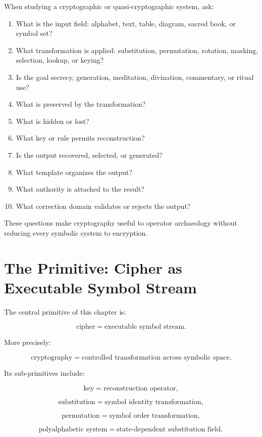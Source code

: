 \documentclass[11pt]{book}
\begin{document}
When studying a cryptographic or quasi-cryptographic system, ask:

\begin{enumerate}[label=\arabic*.]
    \item What is the input field: alphabet, text, table, diagram, sacred book, or symbol set?
    \item What transformation is applied: substitution, permutation, rotation, masking, selection, lookup, or keying?
    \item Is the goal secrecy, generation, meditation, divination, commentary, or ritual use?
    \item What is preserved by the transformation?
    \item What is hidden or lost?
    \item What key or rule permits reconstruction?
    \item Is the output recovered, selected, or generated?
    \item What template organizes the output?
    \item What authority is attached to the result?
    \item What correction domain validates or rejects the output?
\end{enumerate}

These questions make cryptography useful to operator archaeology without reducing every symbolic system to encryption.

\section{The Primitive: Cipher as Executable Symbol Stream}

The central primitive of this chapter is:

\[
\text{cipher} = \text{executable symbol stream}.
\]

More precisely:

\[
\text{cryptography} = \text{controlled transformation across symbolic space}.
\]

Its sub-primitives include:

\[
\text{key} = \text{reconstruction operator},
\]

\[
\text{substitution} = \text{symbol identity transformation},
\]

\[
\text{permutation} = \text{symbol order transformation},
\]

\[
\text{polyalphabetic system} = \text{state-dependent substitution field},
\]
\end{document}
